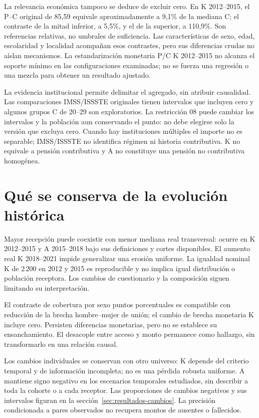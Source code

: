 La relevancia económica tampoco se deduce de excluir cero. En K 2012--2015,
el P--C original de 85{,}59 equivale aproximadamente a 9{,}1\% de la mediana
C; el contraste de la mitad inferior, a 5{,}5\%, y el de la superior, a
110{,}9\%. Son referencias relativas, no umbrales de suficiencia. Las
características de sexo, edad, escolaridad y localidad acompañan esos
contrastes, pero sus diferencias crudas no aíslan mecanismos. La
estandarización monetaria P/C K 2012--2015 no alcanza el soporte mínimo
en las configuraciones examinadas; no se fuerza una regresión o una mezcla
para obtener un resultado ajustado.

La evidencia institucional permite delimitar el agregado, sin atribuir
causalidad. Las comparaciones IMSS/ISSSTE originales tienen intervalos que
incluyen cero y algunos grupos C de 20--29 son exploratorios. La restricción
08 puede cambiar los intervalos y la población aun conservando el punto:
no debe elegirse solo la versión que excluya cero. Cuando hay instituciones
múltiples el importe no es separable; IMSS/ISSSTE no identifica régimen ni
historia contributiva. K no equivale a pensión contributiva y A no constituye
una pensión no contributiva homogénea.

\section{Qué se conserva de la evolución histórica}

Mayor recepción puede coexistir con menor mediana real transversal: ocurre
en K 2012--2015 y A 2015--2018 bajo sus definiciones y cortes disponibles.
El aumento real K 2018--2021 impide generalizar una erosión uniforme. La
igualdad nominal K de 2\,200 en 2012 y 2015 es reproducible y no implica
igual distribución o población receptora. Los cambios de cuestionario y
la composición siguen limitando su interpretación.

El contraste de cobertura por sexo  puntos porcentuales
es compatible con reducción de la brecha hombre--mujer de unión; el cambio
de brecha monetaria K  incluye cero. Persisten diferencias
monetarias, pero no se establece su ensanchamiento. El desacople entre acceso
y monto permanece como hallazgo, sin transformarlo en una relación causal.

Los cambios individuales se conservan con otro universo: K
 depende del criterio temporal y de información incompleta;
no es una pérdida robusta uniforme. A  mantiene signo
negativo en los escenarios temporales estudiados, sin describir a toda la
cohorte o a cada receptor. Las proporciones de cambios negativos y sus
intervalos figuran en la sección~\ref{sec:resultados-cambios}. La precisión
condicionada a pares observados no recupera montos de ausentes o fallecidos.

